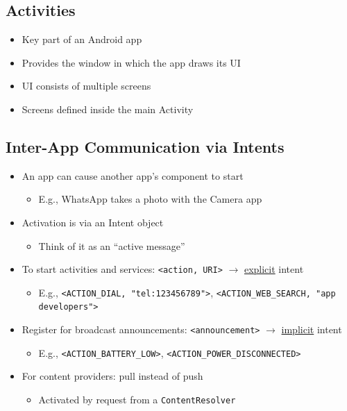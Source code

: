 \subsection{Activities}

\begin{itemize}
  \item Key part of an Android app
  \item Provides the window in which the app draws its UI
  \item UI consists of multiple screens
  \item Screens defined inside the main Activity
\end{itemize}

\subsection{Inter-App Communication via Intents}

\begin{itemize}
  \item An app can cause another app's component to start
  \begin{itemize}
    \item E.g., WhatsApp takes a photo with the Camera app
  \end{itemize}
  \item Activation is via an Intent object
  \begin{itemize}
    \item Think of it as an ``active message''
  \end{itemize}
  \item To start activities and services: \texttt{<action, URI>} $\rightarrow$ \underline{explicit} intent
  \begin{itemize}
    \item E.g., \texttt{<ACTION\_DIAL, "tel:123456789">}, \texttt{<ACTION\_WEB\_SEARCH, "app developers">}
  \end{itemize}
  \item Register for broadcast announcements: \texttt{<announcement>} $\rightarrow$ \underline{implicit} intent
  \begin{itemize}
    \item E.g., \texttt{<ACTION\_BATTERY\_LOW>}, \texttt{<ACTION\_POWER\_DISCONNECTED>}
  \end{itemize}
  \item For content providers: pull instead of push
  \begin{itemize}
    \item Activated by request from a \texttt{ContentResolver}
  \end{itemize}
\end{itemize}

